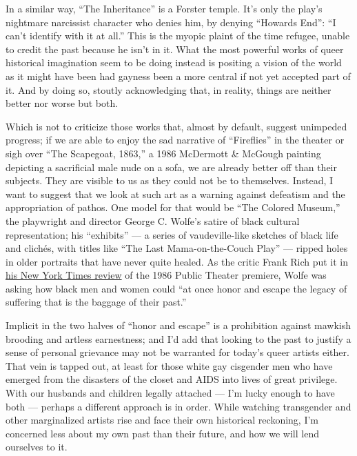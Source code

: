 In a similar way, ``The Inheritance'' is a Forster temple. It's only the
play's nightmare narcissist character who denies him, by denying
``Howards End'': ``I can't identify with it at all.'' This is the myopic
plaint of the time refugee, unable to credit the past because he isn't
in it. What the most powerful works of queer historical imagination seem
to be doing instead is positing a vision of the world as it might have
been had gayness been a more central if not yet accepted part of it. And
by doing so, stoutly acknowledging that, in reality, things are neither
better nor worse but both.

Which is not to criticize those works that, almost by default, suggest
unimpeded progress; if we are able to enjoy the sad narrative of
``Fireflies'' in the theater or sigh over ``The Scapegoat, 1863,'' a
1986 McDermott \& McGough painting depicting a sacrificial male nude on
a sofa, we are already better off than their subjects. They are visible
to us as they could not be to themselves. Instead, I want to suggest
that we look at such art as a warning against defeatism and the
appropriation of pathos. One model for that would be ``The Colored
Museum,'' the playwright and director George C. Wolfe's satire of black
cultural representation; his ``exhibits'' --- a series of
vaudeville-like sketches of black life and clichés, with titles like
``The Last Mama-on-the-Couch Play'' --- ripped holes in older portraits
that have never quite healed. As the critic Frank Rich put it in
\href{https://www.nytimes3xbfgragh.onion/1986/11/03/arts/stage-colored-museum-satire-by-george-c-wolfe.html}{his
New York Times review} of the 1986 Public Theater premiere, Wolfe was
asking how black men and women could ``at once honor and escape the
legacy of suffering that is the baggage of their past.''

Implicit in the two halves of ``honor and escape'' is a prohibition
against mawkish brooding and artless earnestness; and I'd add that
looking to the past to justify a sense of personal grievance may not be
warranted for today's queer artists either. That vein is tapped out, at
least for those white gay cisgender men who have emerged from the
disasters of the closet and AIDS into lives of great privilege. With our
husbands and children legally attached --- I'm lucky enough to have both
--- perhaps a different approach is in order. While watching transgender
and other marginalized artists rise and face their own historical
reckoning, I'm concerned less about my own past than their future, and
how we will lend ourselves to it.

